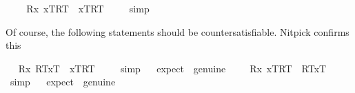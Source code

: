 \begin{isabellebody}
\ \isanewline
\ \isamarkupfalse%
\ {\isachardoublequoteopen}{\isacharbrackleft}{\isacharparenleft}\isactrlbold {\isasymforall}R{\isachardot}\isactrlbold {\isasymforall}x{\isachardot}\ {\isasymlbrace}x\isactrlsup T{\isacharcomma}R\isactrlsup T{\isasymrbrace}\ \isactrlbold {\isasymrightarrow}\ {\isasymlbrace}x\isactrlsup T{\isacharcomma}R\isactrlsup T{\isasymrbrace}{\isacharparenright}{\isacharbrackright}\ {\isacharequal}\ {\isasymtop}{\isachardoublequoteclose}%
\isadelimproof
\ %
\endisadelimproof
%
\isatagproof
{}\isamarkupfalse%
\ simp%
\endisatagproof
{\isafoldproof}%
%
\isadelimproof
%
\endisadelimproof
%
\begin{isamarkuptext}%
Of course, the following statements should be countersatisfiable. Nitpick confirms this%
\end{isamarkuptext}%
\isamarkuptrue%
\ \isamarkupfalse%
\ {\isachardoublequoteopen}{\isacharbrackleft}{\isacharparenleft}\isactrlbold {\isasymforall}R{\isachardot}\isactrlbold {\isasymforall}x{\isachardot}\ {\isasymlparr}R\isactrlsup T{\isacharcomma}x\isactrlsup T{\isasymrparr}\ \isactrlbold {\isasymrightarrow}\ {\isasymlbrace}x\isactrlsup T{\isacharcomma}R\isactrlsup T{\isasymrbrace}{\isacharparenright}{\isacharbrackright}\ {\isacharequal}\ {\isasymtop}{\isachardoublequoteclose}%
\isadelimproof
\ %
\endisadelimproof
%
\isatagproof
{}\isamarkupfalse%
\ simp%
\endisatagproof
{\isafoldproof}%
%
\isadelimproof
%
\endisadelimproof
\ \isamarkupfalse%
\ {\isacharbrackleft}expect\ {\isacharequal}\ genuine{\isacharbrackright}%
\isadelimproof
\ %
\endisadelimproof
%
\isatagproof
{}\isamarkupfalse%
%
\endisatagproof
{\isafoldproof}%
%
\isadelimproof
%
\endisadelimproof
\isanewline
\ \isamarkupfalse%
\ {\isachardoublequoteopen}{\isacharbrackleft}{\isacharparenleft}\isactrlbold {\isasymforall}R{\isachardot}\isactrlbold {\isasymforall}x{\isachardot}\ {\isasymlbrace}x\isactrlsup T{\isacharcomma}R\isactrlsup T{\isasymrbrace}\ \isactrlbold {\isasymrightarrow}\ {\isasymlparr}R\isactrlsup T{\isacharcomma}x\isactrlsup T{\isasymrparr}{\isacharparenright}{\isacharbrackright}\ {\isacharequal}\ {\isasymtop}{\isachardoublequoteclose}%
\isadelimproof
\ %
\endisadelimproof
%
\isatagproof
{}\isamarkupfalse%
\ simp%
\endisatagproof
{\isafoldproof}%
%
\isadelimproof
%
\endisadelimproof
\ \isamarkupfalse%
\ {\isacharbrackleft}expect\ {\isacharequal}\ genuine{\isacharbrackright}%
\isadelimproof
\ %
\endisadelimproof
%
\isatagproof
{}\isamarkupfalse%

\end{isabellebody}
